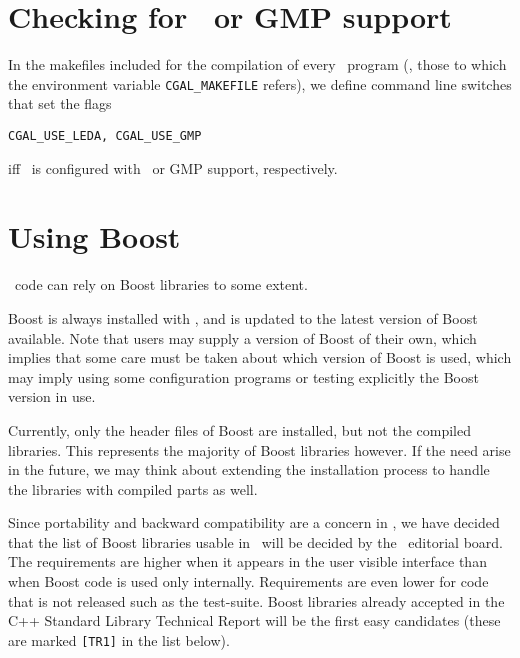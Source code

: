 \section{Checking for \leda\ or GMP support}
\label{sec:leda_gmp_support}

In the makefiles included for the compilation of every \cgal\ program
(\ie, those to which the environment variable {\tt CGAL\_MAKEFILE} refers),
we define command line switches that set the flags 
\begin{verbatim}
CGAL_USE_LEDA, CGAL_USE_GMP
\end{verbatim}
iff \cgal\ is configured with \leda\ or GMP support, respectively.

\section{Using Boost}
\label{sec:boost_support}
\cgal\ code can rely on Boost libraries to some extent.

Boost is always installed with \cgal, and is updated to the latest
version of Boost available.  Note that users may supply a version
of Boost of their own, which implies that some care must be taken
about which version of Boost is used, which may imply using some
configuration programs or testing explicitly the Boost version in
use.

Currently, only the header files of Boost are installed, but not the
compiled libraries.  This represents the majority of Boost libraries
however.  If the need arise in the future, we may think about extending
the installation process to handle the libraries with compiled parts
as well.

Since portability and backward compatibility are a concern in \cgal,
we have decided that the list of Boost libraries usable in \cgal\ will be
decided by the \cgal\ editorial board.  The requirements are higher
when it appears in the user visible interface than when Boost code
is used only internally.  Requirements are even lower for code that
is not released such as the test-suite.  Boost libraries already accepted
in the C++ Standard Library Technical Report will be the first easy
candidates (these are marked \texttt{[TR1]} in the list below).

